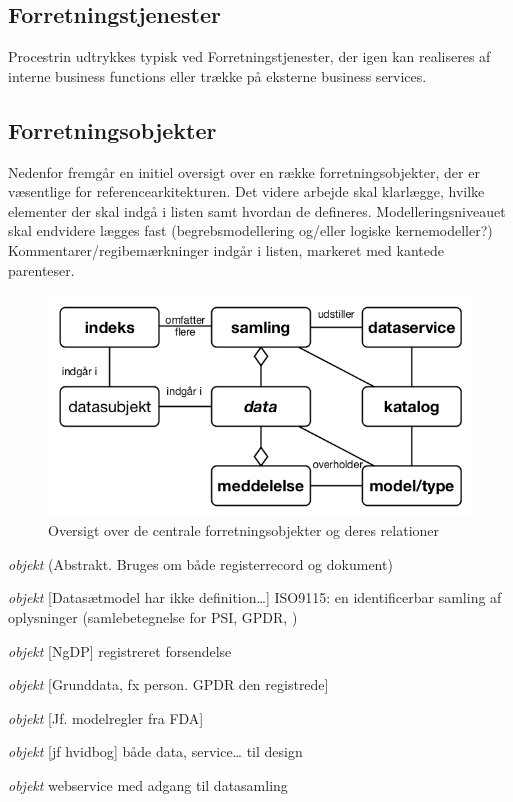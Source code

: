 \subsection{Forretningstjenester}\label{forretningstjenester}

Procestrin udtrykkes typisk ved Forretningstjenester, der igen kan
realiseres af interne business functions eller trække på eksterne
business services.

\subsection{Forretningsobjekter}\label{forretningsobjekter}

Nedenfor fremgår en initiel oversigt over en række forretningsobjekter,
der er væsentlige for referencearkitekturen. Det videre arbejde skal
klarlægge, hvilke elementer der skal indgå i listen samt hvordan de
defineres. Modelleringsniveauet skal endvidere lægges fast
(begrebsmodellering og/eller logiske kernemodeller?)
Kommentarer/regibemærkninger indgår i listen, markeret med kantede
parenteser.

\begin{figure}
\centering
\includegraphics[width=\textwidth]{figures/objekter.png}
\caption{Oversigt over de centrale forretningsobjekter og deres
relationer}
\end{figure}

\begin{description}
\tightlist
\item[data]
\emph{objekt} (Abstrakt. Bruges om både registerrecord og dokument)
\item[samling]
\emph{objekt} {[}Datasætmodel har ikke definition\ldots{}{]} ISO9115: en
identificerbar samling af oplysninger (samlebetegnelse for PSI, GPDR, )
\item[meddelelse]
\emph{objekt} {[}NgDP{]} registreret forsendelse
\item[datasubjekt]
\emph{objekt} {[}Grunddata, fx person. GPDR den registrede{]}
\item[model/type]
\emph{objekt} {[}Jf. modelregler fra FDA{]}
\item[katalog]
\emph{objekt} {[}jf hvidbog{]} både data, service\ldots{} til design
\item[dataservice]
\emph{objekt} webservice med adgang til datasamling
\end{description}

